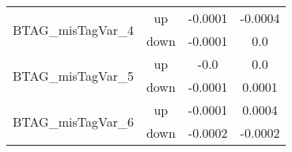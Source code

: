 \begin{table}[h!]
\begin{tabular}{lccc}
\multirow{2}{*}{BTAG\_misTagVar\_4}      & up   &     -0.0001       &     -0.0004      \\
                                       & down &     -0.0001       &     0.0       \\ \hline
\multirow{2}{*}{BTAG\_misTagVar\_5}      & up   &     -0.0         &     0.0      \\
                                       & down &     -0.0001       &     0.0001       \\ \hline
\multirow{2}{*}{BTAG\_misTagVar\_6}      & up   &     -0.0001     &     0.0004      \\
                                       & down &     -0.0002       &     -0.0002       \\ \hline
\hline\hline
\end{tabular}
\end{table}


